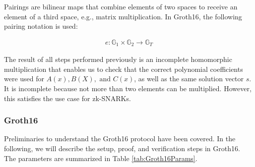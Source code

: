 Pairings are bilinear maps that combine elements of two spaces to receive an element of a third space, e.g., matrix multiplication. In Groth16, the following pairing notation is used:

\begin{align}
    e: \mathbb{G}_1 \times \mathbb{G}_2 \to \mathbb{G}_T
\end{align}

The result of all steps performed previously is an incomplete homomorphic multiplication that enables us to check that the correct polynomial coefficients were used for \(A(x), B(X), \text{ and }C(x)\), as well as the same solution vector \(s\). It is incomplete because not more than two elements can be multiplied. However, this satisfies the use case for zk-SNARKs. 

\subsubsection{Groth16}

Preliminaries to understand the Groth16 protocol have been covered. In the following, we will describe the setup, proof, and verification steps in Groth16. The parameters are summarized in Table \ref{tab:Groth16Params}.


